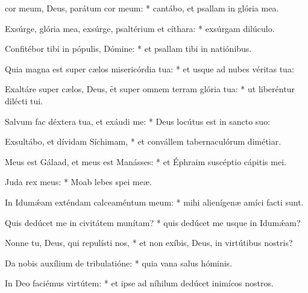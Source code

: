 \begin{psalmus}

		  cor meum, Deus, parátum cor meum: * cantábo, et psallam in glória mea.
		 
		 Exsúrge, glória mea, exsúrge, psaltérium et cíthara: * exsúrgam dilúculo.
		 
		 Confitébor tibi in pópulis, Dómine: * et psallam tibi in natiónibus.
		 
		 Quia magna est super cælos misericórdia tua: * et usque ad nubes véritas tua:
		 
		 Exaltáre super cælos, Deus, \f et super omnem terram glória tua: * ut liberéntur dilécti tui.
		 
		 Salvum fac déxtera tua, et exáudi me: * Deus locútus est in sancto suo:
		 
		 Exsultábo, et dívidam Síchimam, * et convállem tabernaculórum dimétiar.
		 
		 Meus est Gálaad, et meus est Manásses: * et Éphraim suscéptio cápitis mei.
		 
		 Juda rex meus: * Moab lebes spei meæ.
		 
		 In Idumǽam exténdam calceaméntum meum: * mihi alienígenæ amíci facti sunt.
		 
		 Quis dedúcet me in civitátem munítam? * quis dedúcet me usque in Idumǽam?
		 
		 Nonne tu, Deus, qui repulísti nos, * et non exíbis, Deus, in virtútibus nostris?
		 
		 Da nobis auxílium de tribulatióne: * quia vana salus hóminis.
		 
		 In Deo faciémus virtútem: * et ipse ad níhilum dedúcet inimícos nostros.

\end{psalmus}
